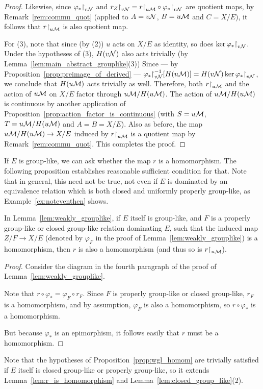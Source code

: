 \begin{proof}
		
		Likewise, since $\varphi_*\mathord{\upharpoonright}_{v{\mathcal N}}$ and $r_Z\mathord{\upharpoonright}_{v{\mathcal N}}=r\mathord{\upharpoonright}_{u{\mathcal M}}\circ\varphi_*\mathord{\upharpoonright}_{v{\mathcal N}}$ are quotient maps, by Remark~\ref{rem:commu_quot} (applied to $A=v{\mathcal N}$, $B=u{\mathcal M}$ and $C=X/E$), it follows that $r\mathord{\upharpoonright}_{u{\mathcal M}}$ is also quotient map.
		
		For (3), note that since (by (2)) $u$ acts on $X/E$ as identity, so does $\ker \varphi_*\mathord{\upharpoonright}_{v{\mathcal N}}$. Under the hypotheses of (3), $H(v{\mathcal N})$ also acts trivially (by Lemma~\ref{lem:main_abstract_grouplike}(3)) Since --- by Proposition~\ref{prop:preimage_of_derived} --- $\varphi_*\mathord{\upharpoonright}_{v{\mathcal N}}^{-1}[H(u{\mathcal M})]=H(v{\mathcal N})\ker \varphi_*\mathord{\upharpoonright}_{v{\mathcal N}}$, we conclude that $H(u{\mathcal M})$ acts trivially as well. Therefore, both $r\mathord{\upharpoonright}_{u{\mathcal M}}$ and the action of $u{\mathcal M}$ on $X/E$ factor through $u{\mathcal M}/H(u{\mathcal M})$. The action of $u{\mathcal M}/H(u{\mathcal M})$ is continuous by another application of Proposition~\ref{prop:action_factor_is_continuous} (with $S=u{\mathcal M}$, $T=u{\mathcal M}/H(u{\mathcal M})$ and $A=B=X/E$). Also as before, the map $u{\mathcal M}/H(u{\mathcal M})\to X/E$ induced by $r\mathord{\upharpoonright}_{u{\mathcal M}}$ is a quotient map by Remark~\ref{rem:commu_quot}. This completes the proof.
	\end{proof}
	If $E$ is group-like, we can ask whether the map $r$ is a homomorphism. The following proposition establishes reasonable sufficient condition for that. Note that in general, this need not be true, not even if $E$ is dominated by an equivalence relation which is both closed and uniformly properly group-like, as Example~\ref{ex:noteventhen} shows.
	\begin{prop}
		\label{prop:wgl_homom}
		In Lemma~\ref{lem:weakly_grouplike}, if $E$ itself is group-like, and $F$ is a properly group-like or closed group-like relation dominating $E$, such that the induced map $Z/F\to X/E$ (denoted by $\varphi_F$ in the proof of Lemma~\ref{lem:weakly_grouplike}) is a homomorphism, then $r$ is also a homomorphism (and thus so is $r\mathord{\upharpoonright}_{u{\mathcal M}}$).
	\end{prop}
	\begin{proof}
		Consider the diagram in the fourth paragraph of the proof of Lemma~\ref{lem:weakly_grouplike}.
		
		Note that $r\circ \varphi_*=\varphi_F\circ r_F$. Since $F$ is properly group-like or closed group-like, $r_F$ is a homomorphism, and by assumption, $\varphi_F$ is also a homomorphism, so $r \circ \varphi_*$ is a homomorphism.
		
		But because $\varphi_*$ is an epimorphism, it follows easily that $r$ must be a homomorphism.
	\end{proof}
	Note that the hypotheses of Proposition~\ref{prop:wgl_homom} are trivially satisfied if $E$ itself is closed group-like or properly group-like, so it extends Lemma~\ref{lem:r_is_homomorphism} and Lemma~\ref{lem:closed_group_like}(2).
	
